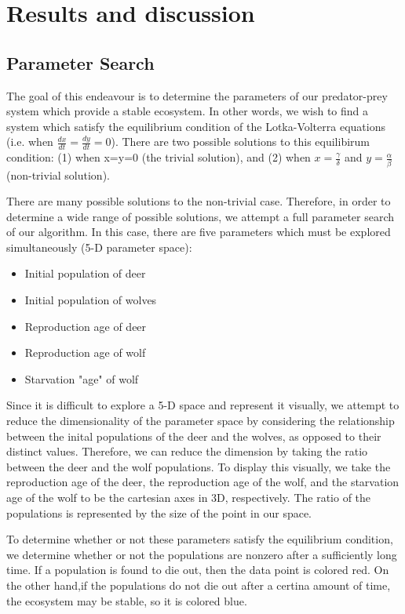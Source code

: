 \documentclass[a4paper,12pt]{article}
\begin{document}
\section{Results and discussion}
\subsection{Parameter Search}
\indent
\indent The goal of this endeavour is to determine the parameters of our predator-prey system which provide a stable ecosystem.  In other words, we wish to find a 
system which satisfy the equilibrium condition of the Lotka-Volterra equations (i.e. when $\frac{dx}{dt} = \frac{dy}{dt} = 0$).  There are two possible solutions to 
this equilibirum condition: (1) when x=y=0 (the trivial solution), and (2) when $x=\frac{\gamma}{\delta}$ and $y=\frac{\alpha}{\beta}$ (non-trivial solution).  

There are many possible solutions to the non-trivial case.  Therefore, in order to determine a wide range of possible solutions, we attempt a full parameter search 
of our algorithm.  In this case, there are five parameters which must be explored simultaneously (5-D parameter space):
\begin{itemize}
  \item{Initial population of deer}
  \item{Initial population of wolves}
  \item{Reproduction age of deer}
  \item{Reproduction age of wolf}
  \item{Starvation "age" of wolf}
\end{itemize}
Since it is difficult to explore a 5-D space and represent it visually, we attempt to reduce the dimensionality of the parameter space by considering the 
relationship between the inital populations of the deer and the wolves, as opposed to their distinct values.  Therefore, we can reduce the dimension by taking 
the ratio between the deer and the wolf populations.  To display this visually, we take the reproduction age of the deer, the reproduction age of the wolf, and 
the starvation age of the wolf to be the cartesian axes in 3D, respectively.  The ratio of the populations is represented by the size of the point in our space.

To determine whether or not these parameters satisfy the equilibrium condition, we determine whether or not the populations are nonzero after a sufficiently long time. 
If a population is found to die out, then the data point is colored red.  On the other hand,if the populations do not die out after a certina amount of time, the 
ecosystem may be stable, so it is colored blue.
\end{document}
